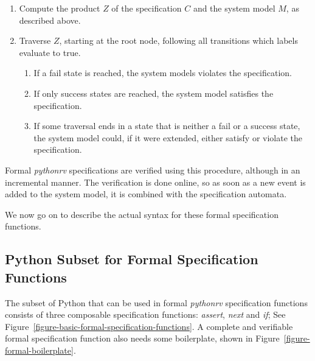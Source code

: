 \documentclass[a4paper,11pt]{kth-mag}
\theoremstyle{definition}
\begin{document}
\begin{enumerate}
  \item Compute the product $Z$ of the specification $C$ and the system model
    $M$, as described above.

  \item Traverse $Z$, starting at the root node, following all transitions
    which labels evaluate to true.

    \begin{enumerate}
      \item If a fail state is reached, the system models violates the
        specification.
      \item If only success states are reached, the system model satisfies the
        specification.
      \item If some traversal ends in a state that is neither a fail or a
        success state, the system model could, if it were extended, either
        satisfy or violate the specification.
    \end{enumerate}
\end{enumerate}

Formal \textit{pythonrv} specifications are verified using this procedure,
although in an incremental manner. The verification is done online, so as soon
as a new event is added to the system model, it is combined with the
specification automata.

We now go on to describe the actual syntax for these formal specification
functions.


\subsection{Python Subset for Formal Specification Functions}
\label{section-approach-python-subset}
\lstset{language=Python,numbers=left}

The subset of Python that can be used in formal \textit{pythonrv} specification
functions consists of three composable specification functions:
\textit{assert}, \textit{next} and \textit{if}; See
Figure~\ref{figure-basic-formal-specification-functions}. A complete and
verifiable formal specification function also needs some boilerplate, shown in
Figure~\ref{figure-formal-boilerplate}.
\end{document}
